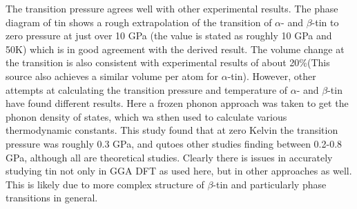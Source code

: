 \documentclass[12pt]{article}
\begin{document}
\bigskip

\noindent The transition pressure agrees well with other experimental results. The phase diagram of tin\cite{pt} shows a rough extrapolation of the transition of $\alpha$- and $\beta$-tin to zero pressure at just over 10 GPa (the value is stated as roughly 10 GPa and 50K) which is in good agreement with the derived result. The volume change at the transition is also consistent with experimental results of about 20\%\cite{jerry}(This source also achieves a similar volume per atom for $\alpha$-tin). However, other attempts at calculating the transition pressure and temperature of $\alpha$- and $\beta$-tin have found different results\cite{firstprinc}. Here a frozen phonon approach was taken to get the phonon density of states, which wa sthen used to calculate various thermodynamic constants. This study found that at zero Kelvin the transition pressure was roughly 0.3 GPa, and qutoes other studies finding between 0.2-0.8 GPa, although all are theoretical studies. Clearly there is issues in accurately studying tin not only in GGA DFT as used here, but in other approaches as well. This is likely due to more complex structure of $\beta$-tin and particularly phase transitions in general.

\clearpage
\printbibliography
	
\end{document}
